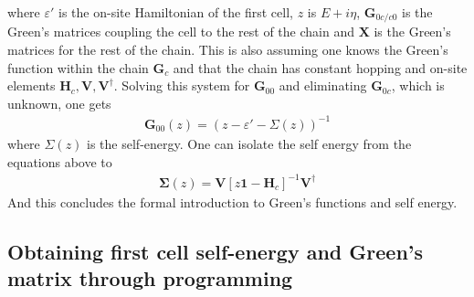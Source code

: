 where \(\varepsilon'\) is the on-site Hamiltonian of the first cell, \(z\) is \(E+i\eta\),  \(\mathbf{G}_{0c/c0}\) is the Green's matrices coupling the cell to the rest of the chain and \(\mathbf{X}\) is the Green's matrices for the rest of the chain. This is also assuming one knows the Green's function within the chain \(\mathbf{G}_c\) and that the chain has constant hopping and on-site elements \(\mathbf{H}_c,\mathbf{V},\mathbf{V}^{\dagger}\). 
Solving this system for \(\mathbf{G}_{00}\) and eliminating \(\mathbf{G}_{0c}\), which is unknown, one gets
\begin{align}\label{greenszero}
    \mathbf{G}_{00}(z) = (z-\varepsilon'-\Sigma(z))^{-1}
\end{align}
where \(\Sigma(z)\) is the self-energy. One can isolate the self energy from the equations above to
\begin{align}
    \mathbf{\Sigma}(z) = \mathbf{V}[z\mathbf{1}-\mathbf{H}_c]^{-1}\mathbf{V}^{\dagger}
\end{align}
And this concludes the formal introduction to Green's functions and self energy.\subsection{Obtaining first cell self-energy and Green's matrix through programming}\label{recursionroutinesec}
